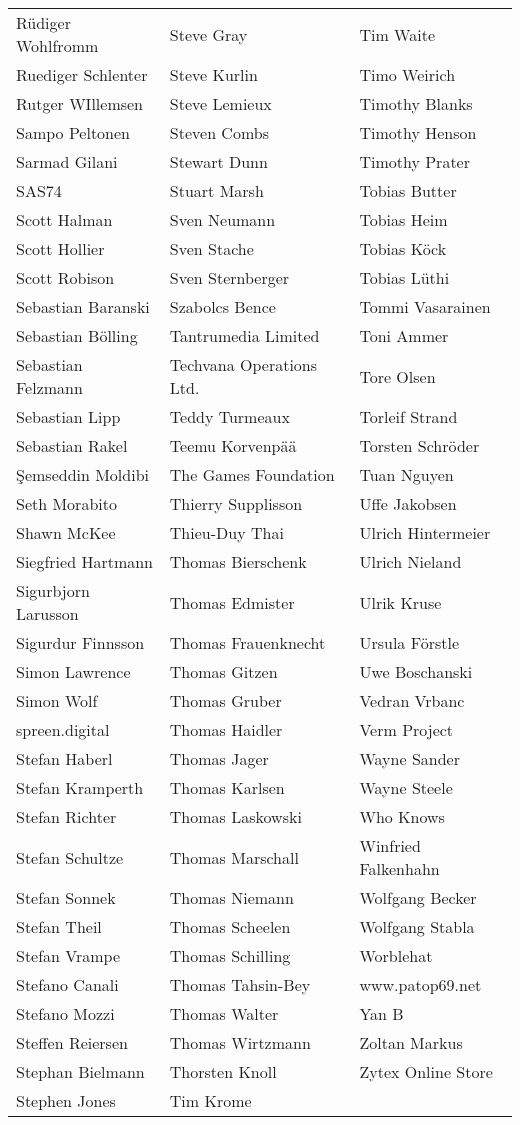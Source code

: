 \begin{tabular}{p{4.5cm}p{4.5cm}p{4.5cm}}
Rüdiger Wohlfromm & Steve Gray & Tim Waite \\
Ruediger Schlenter & Steve Kurlin & Timo Weirich \\
Rutger WIllemsen & Steve Lemieux & Timothy Blanks \\
Sampo Peltonen & Steven Combs & Timothy Henson \\
Sarmad Gilani & Stewart Dunn & Timothy Prater \\
SAS74 & Stuart Marsh & Tobias Butter \\
Scott Halman & Sven Neumann & Tobias Heim \\
Scott Hollier & Sven Stache & Tobias Köck \\
Scott Robison & Sven Sternberger & Tobias Lüthi \\
Sebastian Baranski & Szabolcs Bence & Tommi Vasarainen \\
Sebastian Bölling & Tantrumedia Limited & Toni Ammer \\
Sebastian Felzmann & Techvana Operations Ltd. & Tore Olsen \\
Sebastian Lipp & Teddy Turmeaux & Torleif Strand \\
Sebastian Rakel & Teemu Korvenpää & Torsten Schröder \\
Şemseddin Moldibi & The Games Foundation & Tuan Nguyen \\
Seth Morabito & Thierry Supplisson & Uffe Jakobsen \\
Shawn McKee & Thieu-Duy Thai & Ulrich Hintermeier \\
Siegfried Hartmann & Thomas Bierschenk & Ulrich Nieland \\
Sigurbjorn Larusson & Thomas Edmister & Ulrik Kruse \\
Sigurdur Finnsson & Thomas Frauenknecht & Ursula Förstle \\
Simon Lawrence & Thomas Gitzen & Uwe Boschanski \\
Simon Wolf & Thomas Gruber & Vedran Vrbanc \\
spreen.digital & Thomas Haidler & Verm Project \\
Stefan Haberl & Thomas Jager & Wayne Sander \\
Stefan Kramperth & Thomas Karlsen & Wayne Steele \\
Stefan Richter & Thomas Laskowski & Who Knows \\
Stefan Schultze & Thomas Marschall & Winfried Falkenhahn \\
Stefan Sonnek & Thomas Niemann & Wolfgang Becker \\
Stefan Theil & Thomas Scheelen & Wolfgang Stabla \\
Stefan Vrampe & Thomas Schilling & Worblehat \\
Stefano Canali & Thomas Tahsin-Bey & www.patop69.net \\
Stefano Mozzi & Thomas Walter & Yan B \\
Steffen Reiersen & Thomas Wirtzmann & Zoltan Markus \\
Stephan Bielmann & Thorsten Knoll & Zytex Online Store \\
Stephen Jones & Tim Krome &         \\
\end{tabular}


